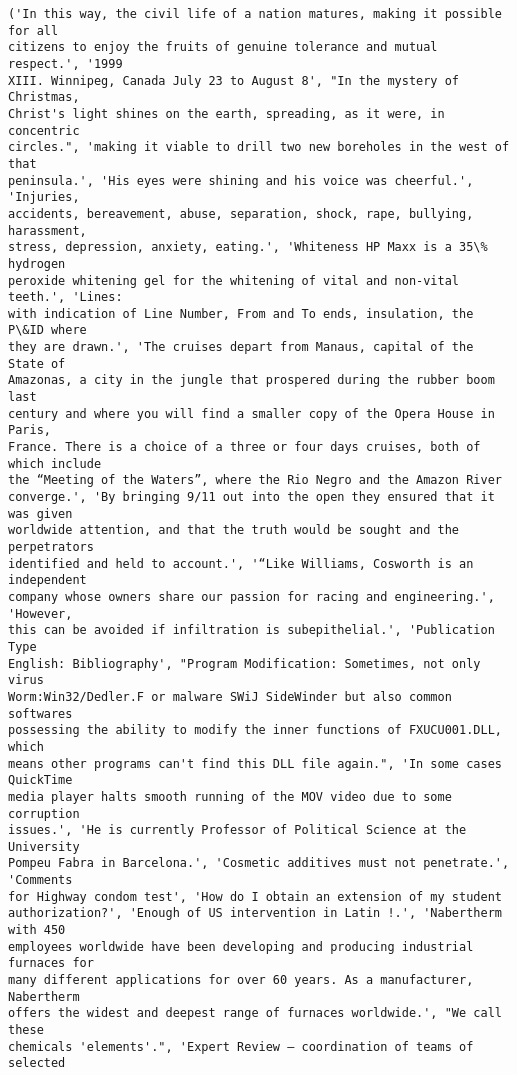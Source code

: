 \documentclass[10pt]{article}
\begin{document}
    
    \begin{Verbatim}[commandchars=\\\{\}]
('In this way, the civil life of a nation matures, making it possible for all
citizens to enjoy the fruits of genuine tolerance and mutual respect.', '1999
XIII. Winnipeg, Canada July 23 to August 8', "In the mystery of Christmas,
Christ's light shines on the earth, spreading, as it were, in concentric
circles.", 'making it viable to drill two new boreholes in the west of that
peninsula.', 'His eyes were shining and his voice was cheerful.', 'Injuries,
accidents, bereavement, abuse, separation, shock, rape, bullying, harassment,
stress, depression, anxiety, eating.', 'Whiteness HP Maxx is a 35\% hydrogen
peroxide whitening gel for the whitening of vital and non-vital teeth.', 'Lines:
with indication of Line Number, From and To ends, insulation, the P\&ID where
they are drawn.', 'The cruises depart from Manaus, capital of the State of
Amazonas, a city in the jungle that prospered during the rubber boom last
century and where you will find a smaller copy of the Opera House in Paris,
France. There is a choice of a three or four days cruises, both of which include
the “Meeting of the Waters”, where the Rio Negro and the Amazon River
converge.', 'By bringing 9/11 out into the open they ensured that it was given
worldwide attention, and that the truth would be sought and the perpetrators
identified and held to account.', '“Like Williams, Cosworth is an independent
company whose owners share our passion for racing and engineering.', 'However,
this can be avoided if infiltration is subepithelial.', 'Publication Type
English: Bibliography', "Program Modification: Sometimes, not only virus
Worm:Win32/Dedler.F or malware SWiJ SideWinder but also common softwares
possessing the ability to modify the inner functions of FXUCU001.DLL, which
means other programs can't find this DLL file again.", 'In some cases QuickTime
media player halts smooth running of the MOV video due to some corruption
issues.', 'He is currently Professor of Political Science at the University
Pompeu Fabra in Barcelona.', 'Cosmetic additives must not penetrate.', 'Comments
for Highway condom test', 'How do I obtain an extension of my student
authorization?', 'Enough of US intervention in Latin !.', 'Nabertherm with 450
employees worldwide have been developing and producing industrial furnaces for
many different applications for over 60 years. As a manufacturer, Nabertherm
offers the widest and deepest range of furnaces worldwide.', "We call these
chemicals 'elements'.", 'Expert Review – coordination of teams of selected

\end{Verbatim}
\end{document}

